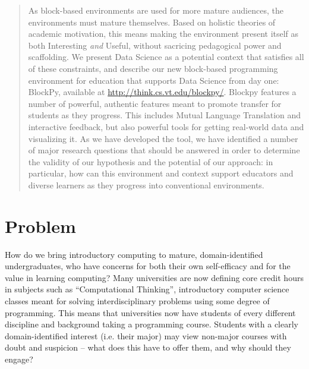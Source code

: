 \documentclass[conference]{IEEEtran}
\begin{document}
\begin{abstract}
As block-based environments are used for more mature audiences, the environments must mature themselves.
Based on holistic theories of academic motivation, this means making the environment present itself as both Interesting \textit{and} Useful, without sacricing pedagogical power and scaffolding.
We present Data Science as a potential context that satisfies all of these constraints, and describe our new block-based programming environment for education that supports Data Science from day one: BlockPy, available at \url{http://think.cs.vt.edu/blockpy/}.
Blockpy features a number of powerful, authentic features meant to promote transfer for students as they progress.
This includes Mutual Language Translation and interactive feedback, but also powerful tools for getting real-world data and visualizing it.
As we have developed the tool, we have identified a number of major research questions that should be answered in order to determine the validity of our hypothesis and the potential of our approach: in particular, how can this environment and context support educators and diverse learners as they progress into conventional environments.
\end{abstract}





%
\IEEEpeerreviewmaketitle



\section{Problem}

How do we bring introductory computing to mature, domain-identified undergraduates, who have concerns for both their own self-efficacy and for the value in learning computing?
Many universities are now defining core credit hours in subjects such as ``Computational Thinking'', introductory computer science classes meant for solving interdisciplinary problems using some degree of programming.
This means that universities now have students of every different discipline and background taking a programming course.
Students with a clearly domain-identified interest (i.e. their major) may view non-major courses with doubt and suspicion -- what does this have to offer them, and why should they engage?
\end{document}
